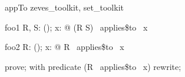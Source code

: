 
\begin{zsection}
 \SECTION appTo \parents zeves\_toolkit, set\_toolkit
\end{zsection}

\begin{theorem}{foo1}
   \forall R, S: \power(\nat \cross \nat); x: \nat @ (R \cup S) ~applies\$to~ x
\end{theorem}

\begin{theorem}{foo2}
   \forall R: \power(\nat \cross \nat); x: \nat @ R ~applies\$to~ x
\end{theorem}

\begin{zproof}[foo2]
   prove;
   with predicate (R~ applies\$to~ x) rewrite;
\end{zproof}